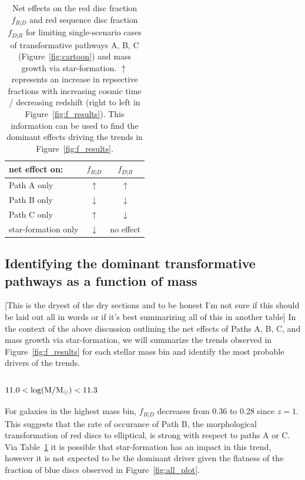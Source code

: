 \documentclass[useAMS,usenatbib]{mn2e}
\begin{document}
\begin{table}
\begin{tabular}{lcc}
\hline
\hline
net effect on:           & $f_{R|D}$      & $f_{D|R}$    \\
\hline
Path A only              &  $\uparrow$    &  $\uparrow$        \\
Path B only              &  $\downarrow$  &  $\downarrow$   \\
Path C only              &  $\uparrow$    &  $\downarrow$   \\
star-formation only      &  $\downarrow$  &  no effect   \\
\hline
\end{tabular}
\caption{Net effects on the red disc fraction $f_{R|D}$ and red sequence disc fraction $f_{D|R}$ for limiting single-scenario cases of transformative pathways A, B, C (Figure~\ref{fig:cartoon}) and mass growth via star-formation. $\uparrow$ represents an increase in repsective fractions with increasing cosmic time / decreasing redshift (right to left in Figure~\ref{fig:f_results}). This information can be used to find the dominant effects driving the trends in Figure~\ref{fig:f_results}. }
\label{tab:arrows}
\end{table}


\subsection{Identifying the dominant transformative pathways as a function of mass}
[This is the dryest of the dry sections and to be honest I'm not sure if this should be laid out all in words or if it's best summarizing all of this in another table]
In the context of the above discussion outlining the net effects of Paths A, B, C, and mass growth via star-formation, we will summarize the trends observed in Figure~\ref{fig:f_results} for each stellar mass bin and identify the most probable drivers of the trends. 

\subsubsection{$\rm 11.0<log(M/M_{\odot})<11.3$}

For galaxies in the highest mass bin, $f_{R|D}$ decreases from 0.36 to 0.28 since $z=1$. This suggests that the rate of occurance of Path B, the morphological transformation of red discs to elliptical, is strong with respect to paths A or C. Via Table~\ref{tab:arrows} it is possible that star-formation has an impact in this trend, however it is not expected to be the dominant driver given the flatness of the fraction of blue discs observed in Figure~\ref{fig:all_plot}.
\end{document}
